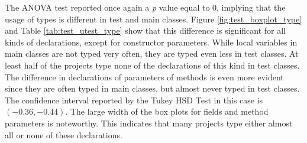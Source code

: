 \documentclass[msc]{ppgccufmg}
\begin{document}
The ANOVA test reported once again a \emph{p} value equal to 0, implying that the usage of types is different in test and main classes.
Figure \ref{fig:test_boxplot_type} and Table \ref{tab:test_utest_type} show that this difference is significant for all kinds of declarations, except for constructor parameters.
While local variables in main classes are not typed very often, they are typed even less in test classes.
At least half of the projects type none of the declarations of this kind in test classes.
The difference in declarations of parameters of methods is even more evident since they are often typed in main classes, but almost never typed in test classes.
The confidence interval reported by the Tukey HSD Test in this case is $(-0.36, -0.44)$.
The large width of the box plots for fields and method parameters is noteworthy.
This indicates that many projects type either almost all or none of these declarations.
\end{document}
